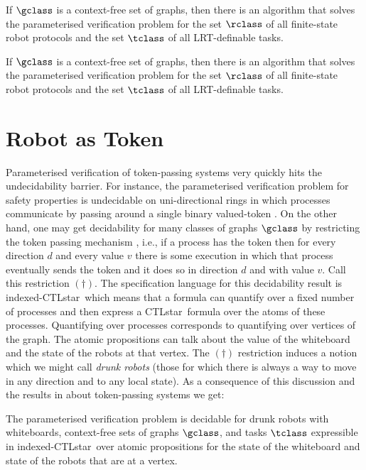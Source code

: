 \begin{corollary}
If $\gclass$ is a context-free set of graphs, then there is an algorithm that
solves the parameterised verification problem for the set $\rclass$ of all
finite-state robot protocols and the set $\tclass$ of all LRT-definable tasks.
\end{corollary}

\begin{corollary}
If $\gclass$ is a context-free set of graphs, then there is an algorithm that
solves the parameterised verification problem for the set $\rclass$ of all
finite-state robot protocols and the set $\tclass$ of all LRT-definable tasks.
\end{corollary}


\def\CTLstar{CTLstar}
\section{Robot as Token}
Parameterised verification of token-passing systems very quickly hits the
undecidability barrier. For instance, the parameterised verification problem for
safety properties is undecidable on uni-directional rings in which processes
communicate by passing around a single binary valued-token
\cite{Suzuki,Emerso03}. On the other hand, one may get decidability for many
classes of graphs $\gclass$ by restricting the token passing mechanism
\cite{Emerso03,CTTV04,AJKR14,AKRSV14}, i.e., if a process has the token then for
every direction $d$ and every value $v$ there is some execution in which that
process eventually sends the token and it does so in direction $d$ and with
value $v$. Call this restriction $(\dagger)$. The specification language for
this decidability result is indexed-\CTLstar\ which means that a formula can
quantify over a fixed number of processes and then express a \CTLstar\ formula
over the atoms of these processes. Quantifying over processes corresponds to
quantifying over vertices of the graph. The atomic propositions can talk about
the value of the whiteboard and the state of the robots at that vertex. The
$(\dagger)$ restriction induces a notion which we might call {\em drunk robots}
(those for which there is always a way to move in any direction and to any local
state). As a consequence of this discussion and the results in \cite{AKRSV14}
about token-passing systems we get:
%
\begin{theorem}
The parameterised verification problem is decidable for drunk robots with
whiteboards, context-free sets of graphs $\gclass$, and tasks $\tclass$
expressible in indexed-\CTLstar\ over atomic propositions for the state of the
whiteboard and state of the robots that are at a vertex.
\end{theorem}
%
%
%
